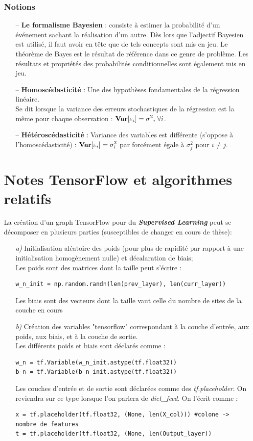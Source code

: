 \documentclass[a4paper,12pt]{report}
\newcommand\bk{\color{black}}
\newcommand\navy{\color{navy}}
\numberwithin{equation}{section} %
\begin{document}
\subsection{Notions}
\begin{itemize}
\item[--] \textbf{Le formalisme Bayesien} : consiste à estimer la probabilité d'un événement sachant la réalisation d'un autre. Dès lors que l'adjectif Bayesien est utilisé, il faut avoir en tête que de tels concepts sont mis en jeu. Le théorème de Bayes est le résultat de référence dans ce genre de problème. Les résultats et propriétés des probabilités conditionnelles sont également mis en jeu.
\item[--] \textbf{Homoscédasticité} : Une des hypothèses fondamentales de la régression linéaire. \\
Se dit lorsque la variance des erreurs stochastiques de la régression est la même pour chaque observation : $\displaystyle \text{\textbf{Var}}[\varepsilon_i] = \sigma^2, \, \forall i$.
\item[--] \textbf{Hétéroscédasticité} : Variance des variables est différente (s'oppose à l'homoscédasticité) : $\displaystyle \text{\textbf{Var}}[\varepsilon_i] = \sigma_i^2$ par forcément égale à $\sigma_j^2$ pour $i \neq j$.
\end{itemize}
\navy \chapter{Notes TensorFlow et algorithmes relatifs} \bk
La création d'un graph TensorFlow pour du \textit{\textbf{Supervised Learning}} peut se décomposer en plusieurs parties (susceptibles de changer en cours de thèse):
\begin{itemize}
\item[\textit{a) }] Initialisation aléatoire des poids (pour plus de rapidité par rapport à une initialisation homogènement nulle) et décalaration de biais; \\
Les poids sont des matrices dont la taille peut s'écrire : 
\begin{lstlisting}
w_n_init = np.random.randn(len(prev_layer), len(curr_layer))
\end{lstlisting}
Les biais sont des vecteurs dont la taille vaut celle du nombre de sites de la couche en cours
\item[\textit{b) }] Création des variables "tensorflow" correspondant à la couche d'entrée, aux poids, aux biais, et à la couche de sortie.\\
Les différents poids et biais sont déclarés comme :
\begin{lstlisting}
w_n = tf.Variable(w_n_init.astype(tf.float32))
b_n = tf.Variable(b_n_init.astype(tf.float32))
\end{lstlisting}
Les couches d'entrée et de sortie sont déclarées comme des \textit{tf.placeholder}. On reviendra sur ce type lorsque l'on parlera de \textit{dict\_feed}. On l'écrit comme :
\begin{lstlisting}
x = tf.placeholder(tf.float32, (None, len(X_col))) #colone -> nombre de features
t = tf.placeholder(tf.float32, (None, len(Output_layer))
\end{lstlisting} 
\end{itemize}
\end{document}
